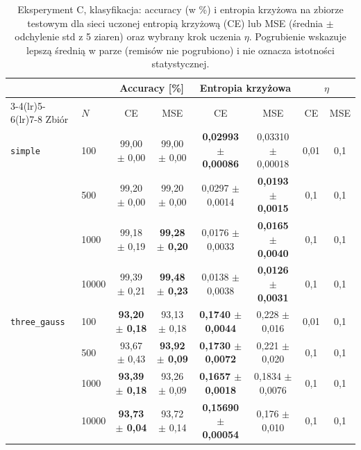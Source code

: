 \documentclass[11pt,a4paper]{article}
\begin{document}
	\begin{table}[H]
		\centering
		\footnotesize
		\setlength{\tabcolsep}{4pt}
		\caption{Eksperyment C, klasyfikacja: accuracy (w \%) i entropia krzyżowa na zbiorze testowym dla sieci uczonej entropią krzyżową (CE) lub MSE (średnia $\pm$ odchylenie std z 5 ziaren) oraz wybrany krok uczenia $\eta$. Pogrubienie wskazuje lepszą średnią w parze (remisów nie pogrubiono) i nie oznacza istotności statystycznej.}\label{tab:C_cls}
		\begin{tabular}{@{}llcccc@{\hspace{12pt}}cc@{}}
			\toprule
			& & \multicolumn{2}{c}{Accuracy [\%]} & \multicolumn{2}{c}{Entropia krzyżowa} & \multicolumn{2}{c}{$\eta$} \\
			\cmidrule(lr){3-4}\cmidrule(lr){5-6}\cmidrule(lr){7-8}
			Zbiór & $N$ & CE & MSE & CE & MSE & CE & MSE \\
			\midrule
			\texttt{simple} & 100 & 99,00 $\pm$ 0,00 & 99,00 $\pm$ 0,00 & \textbf{0,02993 $\pm$ 0,00086} & 0,03310 $\pm$ 0,00018 & 0,01 & 0,1 \\
			& 500 & 99,20 $\pm$ 0,00 & 99,20 $\pm$ 0,00 & 0,0297 $\pm$ 0,0014 & \textbf{0,0193 $\pm$ 0,0015} & 0,1 & 0,1 \\
			& 1000 & 99,18 $\pm$ 0,19 & \textbf{99,28 $\pm$ 0,20} & 0,0176 $\pm$ 0,0033 & \textbf{0,0165 $\pm$ 0,0040} & 0,1 & 0,1 \\
			& 10000 & 99,39 $\pm$ 0,21 & \textbf{99,48 $\pm$ 0,23} & 0,0138 $\pm$ 0,0038 & \textbf{0,0126 $\pm$ 0,0031} & 0,1 & 0,1 \\
			\midrule
			\texttt{three\_gauss} & 100 & \textbf{93,20 $\pm$ 0,18} & 93,13 $\pm$ 0,18 & \textbf{0,1740 $\pm$ 0,0044} & 0,228 $\pm$ 0,016 & 0,01 & 0,1 \\
			& 500 & 93,67 $\pm$ 0,43 & \textbf{93,92 $\pm$ 0,09} & \textbf{0,1730 $\pm$ 0,0072} & 0,221 $\pm$ 0,020 & 0,1 & 0,1 \\
			& 1000 & \textbf{93,39 $\pm$ 0,18} & 93,26 $\pm$ 0,09 & \textbf{0,1657 $\pm$ 0,0018} & 0,1834 $\pm$ 0,0076 & 0,1 & 0,1 \\
			& 10000 & \textbf{93,73 $\pm$ 0,04} & 93,72 $\pm$ 0,14 & \textbf{0,15690 $\pm$ 0,00054} & 0,176 $\pm$ 0,010 & 0,1 & 0,1 \\
			\bottomrule
		\end{tabular}
	\end{table}
	
\end{document}
